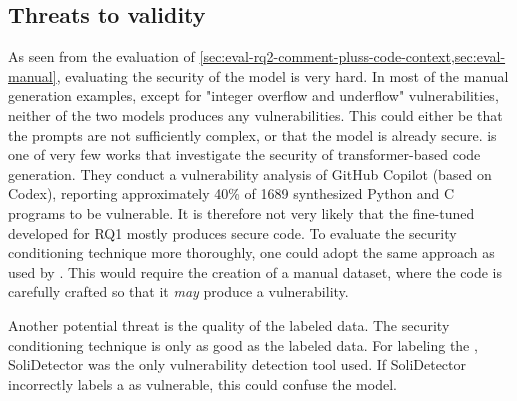 \subsection{Threats to validity}
\label{sec:rq2-threats-to-validity}
As seen from the evaluation of \cref{sec:eval-rq2-comment-pluss-code-context,sec:eval-manual}, evaluating the security of the model is very hard. In most of the manual generation examples, except for "integer overflow and underflow" vulnerabilities, neither of the two models produces any vulnerabilities. This could either be that the prompts are not sufficiently complex, or that the model is already secure. \textcite{pearch2021asleep} is one of very few works that investigate the security of transformer-based code generation. They conduct a vulnerability analysis of GitHub Copilot (based on Codex), reporting approximately 40\% of 1689 synthesized Python and C programs to be vulnerable. It is therefore not very likely that the fine-tuned developed for RQ1 mostly produces secure code. To evaluate the security conditioning technique more thoroughly, one could adopt the same approach as used by \cite{pearch2021asleep}. This would require the creation of a manual dataset, where the code is carefully crafted so that it \textit{may} produce a vulnerability.

Another potential threat is the quality of the labeled data. The security conditioning technique is only as good as the labeled data. For labeling the , SoliDetector was the only vulnerability detection tool used. If SoliDetector incorrectly labels a  as vulnerable, this could confuse the model.
